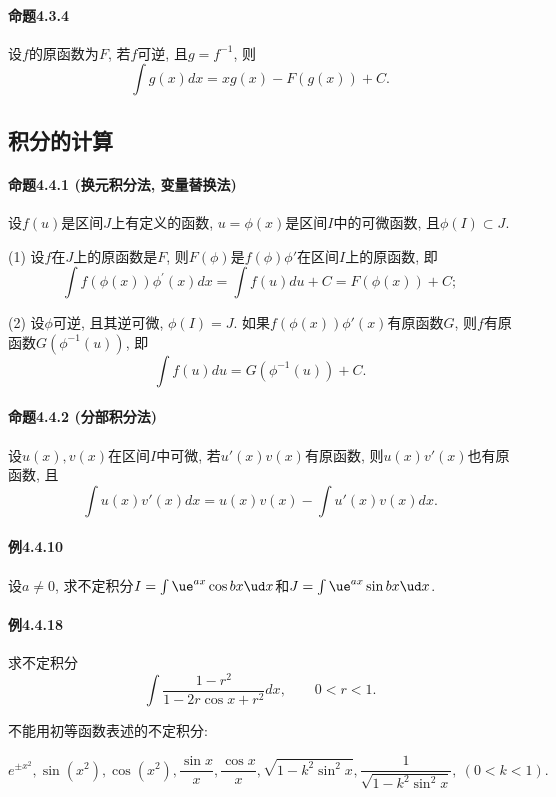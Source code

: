 \paragraph{命题4.3.4}

设$f$的原函数为$F$, 若$f$可逆, 且$g=f^{-1}$, 则
\[
\int g(x)dx=xg(x)-F(g(x))+C.
\]


\subsection{积分的计算}

\paragraph{命题4.4.1 (换元积分法, 变量替换法)}

设$f(u)$是区间$J$上有定义的函数, $u=\phi(x)$是区间$I$中的可微函数, 且$\phi(I)\subset J$.

(1) 设$f$在$J$上的原函数是$F$, 则$F(\phi)$是$f(\phi)\phi'$在区间$I$上的原函数,
即
\[
\int f(\phi(x))\phi^{\prime}(x)dx=\int f(u)du+C=F(\phi(x))+C;
\]

(2) 设$\phi$可逆, 且其逆可微, $\phi(I)=J$. 如果$f(\phi(x))\phi'(x)$有原函数$G$,
则$f$有原函数$G(\phi^{-1}(u))$, 即
\[
\int f(u)du=G(\phi^{-1}(u))+C.
\]


\paragraph{命题4.4.2 (分部积分法)}

设$u(x),v(x)$在区间$I$中可微, 若$u'(x)v(x)$有原函数, 则$u(x)v'(x)$也有原函数, 且
\[
\int u(x)v'(x)dx=u(x)v(x)-\int u'(x)v(x)dx.
\]


\paragraph{例4.4.10}

设$a\ne0$, 求不定积分$I=\int\ue^{ax}\cos bx\ud x$和$J=\int\ue^{ax}\sin bx\ud x$.

\paragraph{例4.4.18}

求不定积分
\[
\int\frac{1-r^{2}}{1-2r\cos x+r^{2}}dx,\qquad0<r<1.
\]

不能用初等函数表述的不定积分:

\[
e^{\pm x^{2}},\sin(x^{2}),\cos(x^{2}),\frac{\sin x}{x},\frac{\cos x}{x},\sqrt{1-k^{2}\sin^{2}x},\frac{1}{\sqrt{1-k^{2}\sin^{2}x}},\ (0<k<1).
\]


